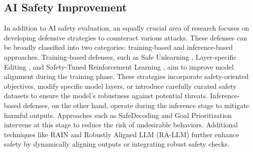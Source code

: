 
\subsection{AI Safety Improvement}
In addition to AI safety evaluation, an equally crucial area of research focuses on developing defensive strategies to counteract various attacks. These defenses can be broadly classified into two categories: training-based and inference-based approaches.
Training-based defenses, such as Safe Unlearning \cite{zhang2024safe}, Layer-specific Editing \cite{zhao2024defending}, and Safety-Tuned Reinforcement Learning \cite{dai2023safe}, aim to improve model alignment during the training phase. These strategies incorporate safety-oriented objectives, modify specific model layers, or introduce carefully curated safety datasets to ensure the model's robustness against potential threats.
Inference-based defenses, on the other hand, operate during the inference stage to mitigate harmful outputs. Approaches such as SafeDecoding \cite{safedecoding} and Goal Prioritization \cite{goal_prioritization} intervene at this stage to reduce the risk of undesirable behaviors. Additional techniques like RAIN \cite{li2023rain} and Robustly Aligned LLM (RA-LLM) \cite{cao2023defending} further enhance safety by dynamically aligning outputs or integrating robust safety checks.

